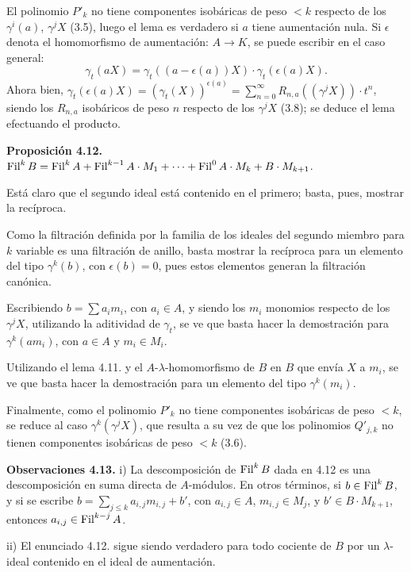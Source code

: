 El polinomio \(P'_k\) no tiene componentes isobáricas de peso \(<k\) respecto de los \(\gamma^i(a)\), \(\gamma^j X\) (3.5), luego el lema es verdadero si \(a\) tiene aumentación nula. Si \(\epsilon\) denota el homomorfismo de aumentación: \(A\to K\), se puede escribir en el caso general:
\[
  \gamma_t(aX)=\gamma_t((a-\epsilon(a))X)\cdot\gamma_t(\epsilon(a)X).
\]
Ahora bien, \(\gamma_t(\epsilon(a)X)=(\gamma_t(X))^{\epsilon(a)}=\sum_{n=0}^{\infty}R_{n,a}((\gamma^j X))\cdot t^n\), siendo los \(R_{n,a}\) isobáricos de peso \(n\) respecto de los \(\gamma^j X\) (3.8); se deduce el lema efectuando el producto.

\textbf{Proposición 4.12.} \(\operatorname{Fil}^k B=\operatorname{Fil}^k A+\operatorname{Fil}^{k-1}A\cdot M_1+\cdots+\operatorname{Fil}^0 A\cdot M_k+B\cdot M_{k+1}\).

Está claro que el segundo ideal está contenido en el primero; basta, pues, mostrar la recíproca.

Como la filtración definida por la familia de los ideales del segundo miembro para \(k\) variable es una filtración de anillo, basta mostrar la recíproca para un elemento del tipo \(\gamma^k(b)\), con \(\epsilon(b)=0\), pues estos elementos generan la filtración canónica.

Escribiendo \(b=\sum a_i m_i\), con \(a_i\in A\), y siendo los \(m_i\) monomios respecto de los \(\gamma^j X\), utilizando la aditividad de \(\gamma_t\), se ve que basta hacer la demostración para \(\gamma^k(am_i)\), con \(a\in A\) y \(m_i\in M_i\).

Utilizando el lema 4.11. y el \(A\)-\(\lambda\)-homomorfismo de \(B\) en \(B\) que envía \(X\) a \(m_i\), se ve que basta hacer la demostración para un elemento del tipo \(\gamma^k(m_i)\).

Finalmente, como el polinomio \(P'_k\) no tiene componentes isobáricas de peso \(<k\), se reduce al caso \(\gamma^k(\gamma^j X)\), que resulta a su vez de que los polinomios \(Q'_{j,k}\) no tienen componentes isobáricas de peso \(<k\) (3.6).

\textbf{Observaciones 4.13.} i) La descomposición de \(\operatorname{Fil}^k B\) dada en 4.12 es una descomposición en suma directa de \(A\)-módulos. En otros términos, si \(b\in\operatorname{Fil}^k B\), y si se escribe \(b=\sum_{j\le k}a_{i,j}m_{i,j}+b'\), con \(a_{i,j}\in A\), \(m_{i,j}\in M_j\), y \(b'\in B\cdot M_{k+1}\), entonces \(a_{i,j}\in\operatorname{Fil}^{k-j}A\).

ii) El enunciado 4.12. sigue siendo verdadero para todo cociente de \(B\) por un \(\lambda\)-ideal contenido en el ideal de aumentación.

